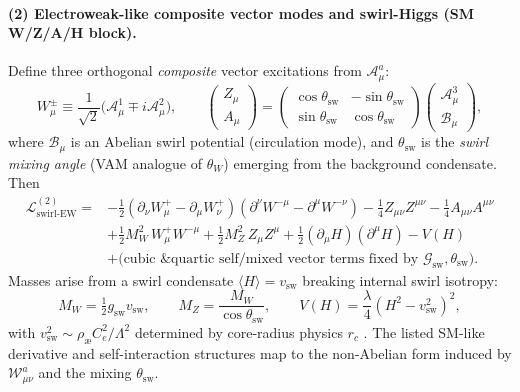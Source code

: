 \documentclass[11pt]{article}
\begin{document}
    \paragraph{(2) Electroweak-like composite vector modes and swirl-Higgs (SM W/Z/A/H block).}
    Define three orthogonal \emph{composite} vector excitations from \(\mathcal{A}_\mu^a\):
    \[
        W_\mu^\pm \equiv \frac{1}{\sqrt{2}}\big(\mathcal{A}_\mu^1 \mp i \mathcal{A}_\mu^2\big),\qquad
        \begin{pmatrix} Z_\mu \\ A_\mu \end{pmatrix}
        =\begin{pmatrix} \cos\theta_\text{sw} & -\sin\theta_\text{sw}\\ \sin\theta_\text{sw}& \cos\theta_\text{sw}\end{pmatrix}
        \begin{pmatrix} \mathcal{A}_\mu^3 \\ \mathcal{B}_\mu \end{pmatrix},
    \]
    where \(\mathcal{B}_\mu\) is an Abelian swirl potential (circulation mode), and \(\theta_\text{sw}\) is the \emph{swirl mixing angle} (VAM analogue of \(\theta_W\)) emerging from the background condensate. Then
    \[
        \boxed{\ \begin{aligned}
                     \mathcal{L}^{(2)}_{\text{swirl-EW}}=&
                     -\tfrac{1}{2}(\partial_\nu W_\mu^+ - \partial_\mu W_\nu^+)(\partial^\nu W^{-\mu}-\partial^\mu W^{-\nu})
                     -\tfrac{1}{4} Z_{\mu\nu}Z^{\mu\nu}
                     -\tfrac{1}{4} A_{\mu\nu}A^{\mu\nu}\\
                     &+\tfrac{1}{2} M_W^2\, W_\mu^+ W^{-\mu}
                     +\tfrac{1}{2} M_Z^2\, Z_\mu Z^\mu
                     +\tfrac{1}{2}(\partial_\mu H)(\partial^\mu H)-V(H)\\
                     &+ \text{(cubic \& quartic self/mixed vector terms fixed by }\mathcal{G}_\text{sw},\theta_\text{sw}).
        \end{aligned}\ }
    \]
    Masses arise from a swirl condensate \(\langle H\rangle=v_\text{sw}\) breaking internal swirl isotropy:
    \[
        M_W=\tfrac{1}{2} g_\text{sw} v_\text{sw},\qquad M_Z=\frac{M_W}{\cos\theta_\text{sw}},
        \qquad V(H)=\frac{\lambda}{4}(H^2-v_\text{sw}^2)^2,
    \]
    with \(v_\text{sw}^2 \sim \rho_\text{\ae} C_e^2/\Lambda^2\) determined by core-radius physics \(r_c\) \cite{Iskandarani2025TimeDilation,Iskandarani2025SwirlClocks,Iskandarani2025Master}.
    The listed SM-like derivative and self-interaction structures map to the non-Abelian form induced by \(\mathcal{W}_{\mu\nu}^a\) and the mixing \(\theta_\text{sw}\).
\end{document}
